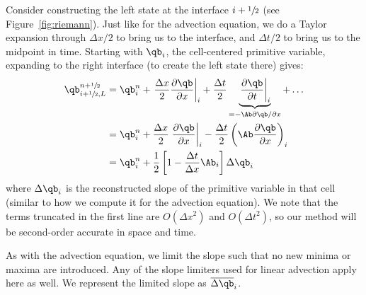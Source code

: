 Consider constructing the left state at the interface $i+{\sfrac{1}{2}}$ (see
Figure~\ref{fig:riemann}).  Just like for the advection equation, we
do a Taylor expansion through $\Delta x/2$ to bring us to the
interface, and $\Delta t/2$ to bring us to the midpoint in time.
Starting with $\qb_i$, the cell-centered primitive variable, expanding
to the right interface (to create the left state there) gives:
\begin{align}
\qb_{i+\myhalf,L}^{n+\myhalf} &= \qb_i^n +
    \left . \frac{\Delta x}{2} \frac{\partial \qb}{\partial x} \right |_i +
    \frac{\Delta t}{2} \underbrace{\left .\frac{\partial \qb}{\partial t} \right |_i}_{= -\Ab \partial \qb / \partial x} + \ldots \\
&= \qb_i^n + \frac{\Delta x}{2} \left . \frac{\partial \qb}{\partial x} \right |_i
          - \frac{\Delta t}{2} \left ( \Ab \frac{\partial \qb}{\partial x} \right )_i\\
&= \qb_i^n + \frac{1}{2} \left [ 1 - \frac{\Delta t}{\Delta x} \Ab_i \right ] \Delta \qb_i \label{eq:taylorstate}
\end{align}
where $\Delta \qb_i$ is the reconstructed slope of the primitive
variable in that cell (similar to how we compute it for the advection
equation).  We note that the terms truncated in the first line are
$O(\Delta x^2)$ and $O(\Delta t^2)$, so our method will be second-order
accurate in space and time.

As with the advection equation, we limit the slope such that no new minima
or maxima are introduced.  Any of the slope limiters used for linear advection
apply here as well.  We represent the limited slope as $\overline{\Delta \qb}_i$.

